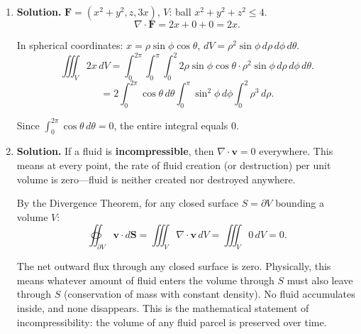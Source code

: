 \begin{enumerate}
\textbf{Divergence:}
\[
\nabla\cdot\mathbf{F} = 0 + x\cos(xy) + 2.
\]

By the Divergence Theorem:
\[
\oiint_{\partial V}\mathbf{F}\cdot\mathbf{n}\,dS = \iiint_V(x\cos(xy)+2)\,dV.
\]

\textbf{Steps:}
\begin{enumerate}
\item The integral of $2$ over $V$: $2\cdot\text{Vol}(V) = 2\cdot\pi(1)^2(5)=10\pi$.

\item The integral of $x\cos(xy)$ over $V$: Note $x\cos(xy)$ is an \emph{odd} function of $x$ (replacing $x\to -x$ gives $-x\cos(-xy)=-x\cos(xy)$), and the domain is symmetric in $x$. Therefore $\iiint_V x\cos(xy)\,dV = 0$.
\end{enumerate}

\[
\boxed{\oiint_{\partial V}\mathbf{F}\cdot\mathbf{n}\,dS = 10\pi.}
\]

\item \textbf{Solution.}
$\mathbf{F}=(x^2+y^2, z, 3x)$, $V$: ball $x^2+y^2+z^2\le 4$.
\[
\nabla\cdot\mathbf{F} = 2x+0+0 = 2x.
\]

In spherical coordinates: $x = \rho\sin\phi\cos\theta$, $dV=\rho^2\sin\phi\,d\rho\,d\phi\,d\theta$.
\[
\iiint_V 2x\,dV = \int_0^{2\pi}\int_0^{\pi}\int_0^{2} 2\rho\sin\phi\cos\theta\cdot\rho^2\sin\phi\,d\rho\,d\phi\,d\theta.
\]
\[
\boxed{= 2\int_0^{2\pi}\cos\theta\,d\theta\int_0^{\pi}\sin^2\phi\,d\phi\int_0^2\rho^3\,d\rho.}
\]

Since $\int_0^{2\pi}\cos\theta\,d\theta = 0$, the entire integral equals $\boxed{0}$.

\item \textbf{Solution.}
If a fluid is \textbf{incompressible}, then $\nabla\cdot\mathbf{v}=0$ everywhere. This means at every point, the rate of fluid creation (or destruction) per unit volume is zero---fluid is neither created nor destroyed anywhere.

By the Divergence Theorem, for any closed surface $S=\partial V$ bounding a volume $V$:
\[
\oiint_{\partial V}\mathbf{v}\cdot d\mathbf{S} = \iiint_V\nabla\cdot\mathbf{v}\,dV = \iiint_V 0\,dV = 0.
\]

The net outward flux through any closed surface is zero. Physically, this means whatever amount of fluid enters the volume through $S$ must also leave through $S$ (conservation of mass with constant density). No fluid accumulates inside, and none disappears. This is the mathematical statement of incompressibility: the volume of any fluid parcel is preserved over time.

\end{enumerate}
